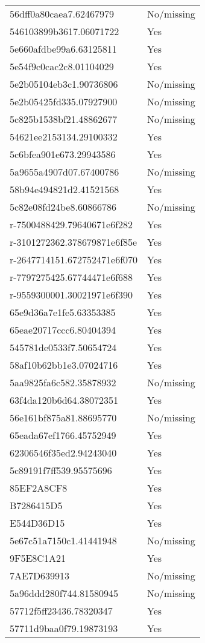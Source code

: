 \begin{tabular}{ll}
56dff0a80caea7.62467979 & No/missing \\
546103899b3617.06071722 & Yes \\
5e660afdbe99a6.63125811 & Yes \\
5e54f9c0cac2c8.01104029 & Yes \\
5e2b05104eb3c1.90736806 & No/missing \\
5e2b05425fd335.07927900 & No/missing \\
5c825b1538bf21.48862677 & No/missing \\
54621ee2153134.29100332 & Yes \\
5c6bfea901e673.29943586 & Yes \\
5a9655a4907d07.67400786 & No/missing \\
58b94e494821d2.41521568 & Yes \\
5c82e08fd24be8.60866786 & No/missing \\
r-7500488429.79640671e6f282 & Yes \\
r-3101272362.378679871e6f85e & Yes \\
r-2647714151.672752471e6f070 & Yes \\
r-7797275425.67744471e6f688 & Yes \\
r-9559300001.30021971e6f390 & Yes \\
65e9d36a7e1fe5.63353385 & Yes \\
65eae20717ccc6.80404394 & Yes \\
545781de0533f7.50654724 & Yes \\
58af10b62bb1e3.07024716 & Yes \\
5aa9825fa6c582.35878932 & No/missing \\
63f4da120b6d64.38072351 & Yes \\
56e161bf875a81.88695770 & No/missing \\
65eada67ef1766.45752949 & Yes \\
62306546f35ed2.94243040 & Yes \\
5c89191f7ff539.95575696 & Yes \\
85EF2A8CF8 & Yes \\
B7286415D5 & Yes \\
E544D36D15 & Yes \\
5e67c51a7150c1.41441948 & No/missing \\
9F5E8C1A21 & Yes \\
7AE7D639913 & No/missing \\
5a96ddd280f744.81580945 & No/missing \\
57712f5ff23436.78320347 & Yes \\
57711d9baa0f79.19873193 & Yes \\

\end{tabular}
